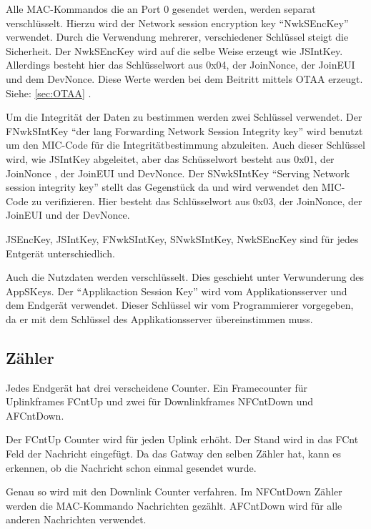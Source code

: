 \documentclass[a4paper, 12pt]{article}
\begin{document}
            Alle MAC-Kommandos die an Port 0 gesendet werden, werden separat verschlüsselt. 
            Hierzu wird der Network session encryption key ``NwkSEncKey'' verwendet. 
            Durch die Verwendung mehrerer, verschiedener Schlüssel steigt die Sicherheit. 
            Der NwkSEncKey wird auf die selbe Weise erzeugt wie JSIntKey. Allerdings besteht hier das Schlüsselwort 
            aus 0x04, der JoinNonce, der JoinEUI und dem DevNonce. Diese Werte werden bei dem Beitritt mittels OTAA 
            erzeugt. Siehe: \ref{sec:OTAA} .

            Um die Integrität der Daten zu bestimmen werden zwei Schlüssel verwendet. Der FNwkSIntKey ``der lang Forwarding 
            Network Session Integrity key'' wird benutzt um den MIC-Code für die Integritätbestimmung abzuleiten. Auch 
            dieser Schlüssel wird, wie JSIntKey abgeleitet, aber das Schüsselwort besteht aus 0x01, der JoinNonce , der 
            JoinEUI und DevNonce. Der SNwkSIntKey ``Serving Network session integrity key'' stellt das Gegenstück da und 
            wird verwendet den MIC-Code zu verifizieren. Hier besteht das Schlüsselwort aus 0x03, der 
            JoinNonce, der JoinEUI und der DevNonce.

            JSEncKey, JSIntKey, FNwkSIntKey, SNwkSIntKey, NwkSEncKey sind für jedes Entgerät unterschiedlich.

            Auch die Nutzdaten werden verschlüsselt. Dies geschieht unter Verwunderung des AppSKeys. 
            Der ``Applikaction Session Key'' wird vom Applikationsserver und dem Endgerät verwendet. 
            Dieser Schlüssel wir vom Programmierer vorgegeben, da er 
            mit dem Schlüssel des Applikationsserver übereinstimmen muss.\cite[S.50 ff]{LoRaSpec}

        \subsection{Zähler}\label{sec:Zaehler}
            Jedes Endgerät hat drei verscheidene Counter. Ein Framecounter für Uplinkframes FCntUp und zwei für 
            Downlinkframes NFCntDown und AFCntDown. 

            Der FCntUp Counter wird für jeden Uplink erhöht. Der Stand wird in das FCnt Feld der 
            Nachricht eingefügt. Da das Gatway den selben Zähler hat, kann es erkennen, ob die Nachricht schon einmal 
            gesendet wurde.

            Genau so wird mit den Downlink Counter verfahren. Im NFCntDown Zähler werden die 
            MAC-Kommando Nachrichten gezählt. AFCntDown wird für alle anderen Nachrichten verwendet.
            \cite[S.22 ff]{LoRaSecur}
\end{document}
